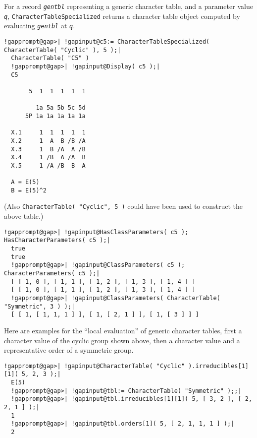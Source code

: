 \documentclass[a4paper,11pt]{report}
\begin{document}
{{{ For a record \mbox{\texttt{\mdseries\slshape gentbl}} representing a generic character table, and a parameter value \mbox{\texttt{\mdseries\slshape q}}, \texttt{CharacterTableSpecialized} returns a character table object computed by evaluating \mbox{\texttt{\mdseries\slshape gentbl}} at \mbox{\texttt{\mdseries\slshape q}}. 

 
\begin{Verbatim}[commandchars=!@|,fontsize=\small,frame=single,label=Example]
  !gapprompt@gap>| !gapinput@c5:= CharacterTableSpecialized( CharacterTable( "Cyclic" ), 5 );|
  CharacterTable( "C5" )
  !gapprompt@gap>| !gapinput@Display( c5 );|
  C5
  
       5  1  1  1  1  1
  
         1a 5a 5b 5c 5d
      5P 1a 1a 1a 1a 1a
  
  X.1     1  1  1  1  1
  X.2     1  A  B /B /A
  X.3     1  B /A  A /B
  X.4     1 /B  A /A  B
  X.5     1 /A /B  B  A
  
  A = E(5)
  B = E(5)^2
\end{Verbatim}
 

 (Also \texttt{CharacterTable( "Cyclic", 5 )} could have been used to construct the above table.) 

 
\begin{Verbatim}[commandchars=!@|,fontsize=\small,frame=single,label=Example]
  !gapprompt@gap>| !gapinput@HasClassParameters( c5 );  HasCharacterParameters( c5 );|
  true
  true
  !gapprompt@gap>| !gapinput@ClassParameters( c5 );  CharacterParameters( c5 );|
  [ [ 1, 0 ], [ 1, 1 ], [ 1, 2 ], [ 1, 3 ], [ 1, 4 ] ]
  [ [ 1, 0 ], [ 1, 1 ], [ 1, 2 ], [ 1, 3 ], [ 1, 4 ] ]
  !gapprompt@gap>| !gapinput@ClassParameters( CharacterTable( "Symmetric", 3 ) );|
  [ [ 1, [ 1, 1, 1 ] ], [ 1, [ 2, 1 ] ], [ 1, [ 3 ] ] ]
\end{Verbatim}
 

 Here are examples for the ``local evaluation'' of generic character tables, first a character value of the cyclic group shown
above, then a character value and a representative order of a symmetric group. 

 
\begin{Verbatim}[commandchars=!@|,fontsize=\small,frame=single,label=Example]
  !gapprompt@gap>| !gapinput@CharacterTable( "Cyclic" ).irreducibles[1][1]( 5, 2, 3 );|
  E(5)
  !gapprompt@gap>| !gapinput@tbl:= CharacterTable( "Symmetric" );;|
  !gapprompt@gap>| !gapinput@tbl.irreducibles[1][1]( 5, [ 3, 2 ], [ 2, 2, 1 ] );|
  1
  !gapprompt@gap>| !gapinput@tbl.orders[1]( 5, [ 2, 1, 1, 1 ] );|
  2
\end{Verbatim}
 }

}}
\end{document}
